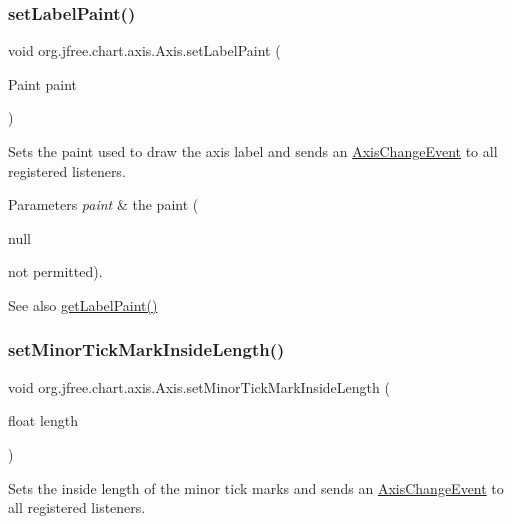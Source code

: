 \subsubsection{\texorpdfstring{set\+Label\+Paint()}{setLabelPaint()}}
{\footnotesize\ttfamily void org.\+jfree.\+chart.\+axis.\+Axis.\+set\+Label\+Paint (\begin{DoxyParamCaption}\item[{Paint}]{paint }\end{DoxyParamCaption})}

Sets the paint used to draw the axis label and sends an \mbox{\hyperlink{}{Axis\+Change\+Event}} to all registered listeners.


\begin{DoxyParams}{Parameters}
{\em paint} & the paint (
\begin{DoxyCode}
null 
\end{DoxyCode}
 not permitted).\\
\hline
\end{DoxyParams}
\begin{DoxySeeAlso}{See also}
\mbox{\hyperlink{classorg_1_1jfree_1_1chart_1_1axis_1_1_axis_a81988e297d1403bfb05c2d0ba038cac5}{get\+Label\+Paint()}} 
\end{DoxySeeAlso}
\mbox{\label{classorg_1_1jfree_1_1chart_1_1axis_1_1_axis_ab0f964e867920549fe0330bd94a6c0e2}} 
\subsubsection{\texorpdfstring{set\+Minor\+Tick\+Mark\+Inside\+Length()}{setMinorTickMarkInsideLength()}}
{\footnotesize\ttfamily void org.\+jfree.\+chart.\+axis.\+Axis.\+set\+Minor\+Tick\+Mark\+Inside\+Length (\begin{DoxyParamCaption}\item[{float}]{length }\end{DoxyParamCaption})}

Sets the inside length of the minor tick marks and sends an \mbox{\hyperlink{}{Axis\+Change\+Event}} to all registered listeners.


